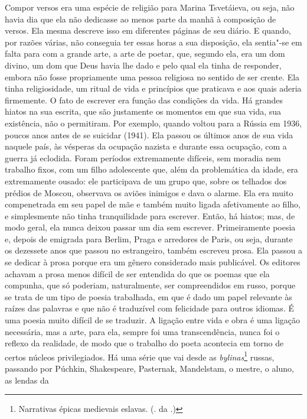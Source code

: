 Compor versos era uma espécie de religião para Marina
Tsvetáieva, ou seja, não havia dia que ela não dedicasse ao menos parte
da manhã à composição de versos. Ela mesma descreve isso em diferentes
páginas de seu diário. E quando, por razões várias, não conseguia ter
essas horas a sua disposição, ela sentia"-se em falta para com a grande
arte, a arte de poetar, que, segundo ela, era um dom divino, um dom que
Deus havia lhe dado e pelo qual ela tinha de responder, embora não fosse
propriamente uma pessoa religiosa no sentido de ser crente. Ela tinha
religiosidade, um ritual de vida e princípios que praticava e aos quais
aderia firmemente. O fato de escrever era função das condições da vida.
Há grandes hiatos na sua escrita, que são justamente os momentos em que
sua vida, sua existência, não o permitiram. Por exemplo, quando voltou
para a Rússia em 1936, poucos anos antes de se suicidar (1941). Ela
passou os últimos anos de sua vida naquele país, às vésperas da ocupação
nazista e durante essa ocupação, com a guerra já eclodida. Foram
períodos extremamente difíceis, sem moradia nem trabalho fixos, com um
filho adolescente que, além da problemática da idade, era extremamente
ousado: ele participava de um grupo que, sobre os telhados dos prédios
de Moscou, observava os aviões inimigos e dava o alarme. Ela era muito
compenetrada em seu papel de mãe e também muito ligada afetivamente ao
filho, e simplesmente não tinha tranquilidade para escrever. Então, há
hiatos; mas, de modo geral, ela nunca deixou passar um dia sem escrever.
Primeiramente poesia e, depois de emigrada para Berlim, Praga e
arredores de Paris, ou seja, durante os dezessete anos que passou no
estrangeiro, também escreveu prosa. Ela passou a se dedicar à prosa
porque era um gênero considerado mais publicável. Os editores achavam a
prosa menos difícil de ser entendida do que os poemas que ela compunha,
que só poderiam, naturalmente, ser compreendidos em russo, porque se
trata de um tipo de poesia trabalhada, em que é dado um papel relevante
às raízes das palavras e que não é traduzível com felicidade para outros
idiomas. É uma poesia muito difícil de se traduzir. A ligação entre vida
e obra é uma ligação necessária, mas a arte, para ela, sempre foi uma
transcendência, nunca foi o reflexo da realidade, de modo que o trabalho
do poeta acontecia em torno de certos núcleos privilegiados. Há uma
série que vai desde as \emph{bylinas}\footnote{Narrativas épicas
  medievais eslavas. (. da .)} russas, passando por Púchkin,
Shakespeare, Pasternak, Mandelstam, o mestre, o aluno, as lendas da
